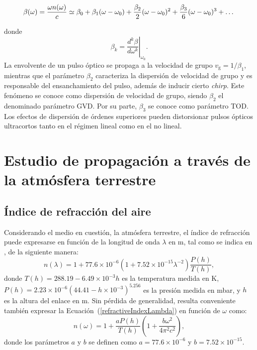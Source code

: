 \begin{equation}
\beta(\omega)=\dfrac{\omega\\n(\omega)}{c}\simeq 
\beta_{0} + \beta_{1}(\omega-\omega_{0}) + \dfrac{\beta_{2}}{2}(\omega-\omega_{0})^2
+ \dfrac{\beta_{3}}{6}(\omega-\omega_{0})^3+\dots
\end{equation}

donde
\begin{equation}
\beta_{k}=\left.\frac{d^{k}\beta}{d\omega^{k}}\right\vert_{\omega_{0}}.
\end{equation}
La envolvente de un pulso óptico se propaga a la velocidad de grupo $v_\mathrm{g}=1/\beta_{1}$, mientras que el parámetro $\beta_{2}$ caracteriza la dispersión de velocidad de grupo y es responsable del ensanchamiento del pulso, además de inducir cierto \textit{chirp}. Este fenómeno se conoce como dispersión de velocidad de grupo, siendo $\beta_{2}$ el denominado parámetro GVD. Por su parte, $\beta_{3}$ se conoce como parámetro TOD. Los efectos de dispersión de órdenes superiores pueden distorsionar pulsos ópticos ultracortos tanto en el régimen lineal como en el no lineal.

\section{Estudio de propagación a través de la atmósfera terrestre}
\subsection{Índice de refracción del aire}
Considerando el medio en cuestión, la atmósfera terrestre, el índice de refracción puede expresarse en función de la longitud de onda $\lambda$ en m, tal como se indica en \cite{Owens,Andrews}, de la siguiente manera:
\begin{equation}\label{refractiveIndexLambda}
n(\lambda)=1+77.6\times10^{-6}\left(1+7.52\times10^{-15}\lambda^{-2}\right)\frac{P(h)}{T(h)},
\end{equation}
donde $T(h)=288.19-6.49\times10^{-3}h$ es la temperatura medida en K, $P(h)=2.23\times10^{-6}(44.41-h\times10^{-3})^{5.256}$ es la presión medida en mbar, y $h$ es la altura del enlace en m. Sin pérdida de generalidad, resulta conveniente también expresar la \mbox{Ecuación (\ref{refractiveIndexLambda})} en función de $\omega$ como:
\begin{equation}
n(\omega)=1+\frac{aP(h)}{T(h)}\left(1+\frac{b\omega^{2}}{4\pi^{2}c^{2}}\right),
\end{equation}
donde los parámetros $a$ y $b$ se definen como $a=77.6\times10^{-6}$ y $b=7.52\times10^{-15}$.

